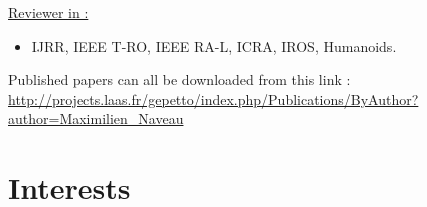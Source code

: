 \documentclass[11pt,a4paper]{moderncv}
\newcommand{\items}{\item[*] \hspace{2mm}}
\begin{document}
\large{\underline{Reviewer in :}}
\begin{itemize}%
\items IJRR, IEEE T-RO, IEEE RA-L, ICRA, IROS, Humanoids.
\end{itemize}

\vspace*{1cm}

Published papers can all be downloaded from this link :
\url{http://projects.laas.fr/gepetto/index.php/Publications/ByAuthor?author=Maximilien_Naveau}\\

\section{Interests}

\end{document}
